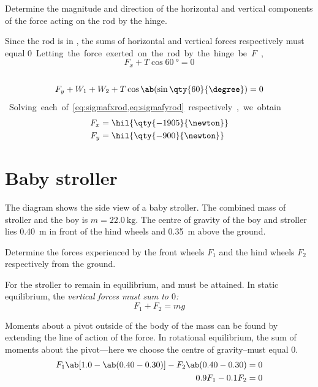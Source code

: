 \begin{problem}
Determine the magnitude and direction of the horizontal and
vertical components
of the force acting on the rod by the hinge.
\end{problem}
Since the rod is in , the sums of horizontal
and vertical forces respectively must equal \qty{0}. Letting the force exerted
on the rod by the hinge be \({F}\),
\begin{equation}
	\label{eq:sigmafxrod}
	{F}_x + {T}\cos\qty{60}{\degree} = 0
\end{equation}
\begin{equation}
	\label{eq:sigmafyrod}
	{F}_y + {W}_1 + {W}_2 + {T}\cos\ab(\sin{\qty{60}{\degree}} )= 0
\end{equation}

Solving each of \cref{eq:sigmafxrod,eq:sigmafyrod} respectively, we obtain
\begin{align*}
	{F}_x & = \hil{\qty{-1905}{\newton}} \\
	{F}_y & = \hil{\qty{-900}{\newton}}
\end{align*}

\section{Baby stroller}
\begin{problem}
The diagram shows the side view of a baby stroller. The combined
mass of stroller and the boy is \(m = \qty{22.0}{\kilo\gram}\). The centre
of gravity of the boy and stroller lies \qty{0.40}{\metre} in front
of the hind wheels
and \qty{0.35}{\metre} above the ground.

Determine the forces experienced by the front wheels \(F_1\) and
the hind wheels
\(F_2\) respectively from the ground.
\end{problem}

For the stroller to remain in equilibrium, 
and 
must be attained. In static equilibrium, the \it{vertical} forces
must sum to \(0\):
\begin{equation}
	F_1 + F_2 = mg
	\label{eq:stateq}
\end{equation}

Moments about a pivot outside of the body of the mass can be found by
extending the line of action
of the force. In {rotational equilibrium}, the sum of moments about
the pivot---here we choose
the centre of gravity--must equal \(0\).
\begin{align}
	F_1\ab[1.0-\ab(0.40-0.30)] - F_2\ab(0.40-0.30) & =0 \\
	0.9F_1 - 0.1F_2                                & =0
	\label{eq:roteq}
\end{align}

